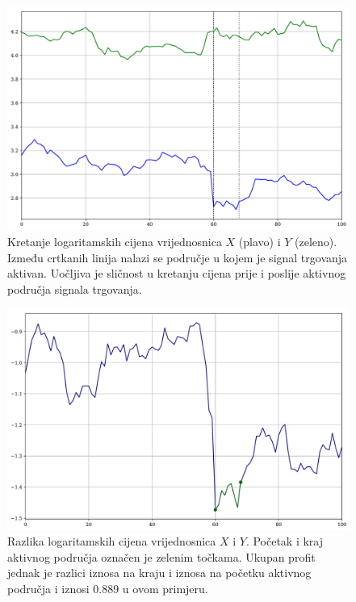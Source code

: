 \documentclass[lmodern, utf8, diplomski, numeric]{fer}
\begin{document}
{  \begin{figure}[p]
    \centering
    \includegraphics[width=\linewidth]{graphics/trading-signal.pdf}
    \caption{
      Kretanje logaritamskih cijena vrijednosnica $X$ (plavo) i $Y$ (zeleno).
      Između crtkanih linija nalazi se područje u kojem je signal trgovanja aktivan. Uočljiva je sličnost u kretanju cijena prije i poslije aktivnog područja signala trgovanja.}
    \label{fig:trading-signal}
  \end{figure}

  \begin{figure}[p]
    \centering
    \includegraphics[width=\linewidth]{graphics/trading-diffs.pdf}
    \caption{Razlika logaritamskih cijena vrijednosnica $X$ i $Y$. Početak i kraj aktivnog područja označen je zelenim točkama. Ukupan profit jednak je razlici iznosa na kraju i iznosa na početku aktivnog područja i iznosi 0.889 u ovom primjeru.}
    \label{fig:trading-diffs}
  \end{figure}
  \clearpage
  } 
\end{document}
